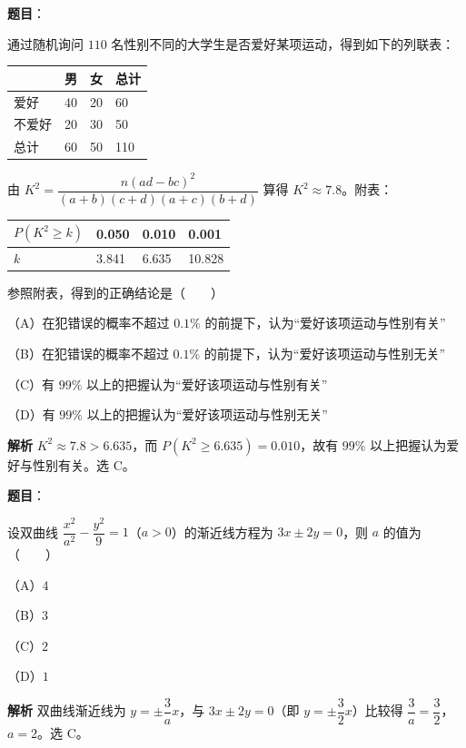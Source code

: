 \begin{answer}

\textbf{题目}：

通过随机询问 $110$ 名性别不同的大学生是否爱好某项运动，得到如下的列联表：

\begin{center}
\begin{tabular}{llll}
\toprule
 & 男 & 女 & 总计 \\
\midrule
爱好 & 40 & 20 & 60 \\
不爱好 & 20 & 30 & 50 \\
总计 & 60 & 50 & 110 \\
\bottomrule
\end{tabular}
\end{center}

由 $K^2=\dfrac{n(ad-bc)^2}{(a+b)(c+d)(a+c)(b+d)}$ 算得 $K^2\approx7.8$。附表：

\begin{center}
\begin{tabular}{llll}
\toprule
$P(K^2\geqslant k)$ & 0.050 & 0.010 & 0.001 \\
\midrule
$k$ & 3.841 & 6.635 & 10.828 \\
\bottomrule
\end{tabular}
\end{center}

参照附表，得到的正确结论是\mbox{（　　）}

（A）在犯错误的概率不超过 $0.1\%$ 的前提下，认为“爱好该项运动与性别有关”

（B）在犯错误的概率不超过 $0.1\%$ 的前提下，认为“爱好该项运动与性别无关”

（C）有 $99\%$ 以上的把握认为“爱好该项运动与性别有关”

（D）有 $99\%$ 以上的把握认为“爱好该项运动与性别无关”

\textbf{解析}
$K^2\approx7.8>6.635$，而 $P(K^2\geqslant6.635)=0.010$，故有 $99\%$ 以上把握认为爱好与性别有关。选 C。


\end{answer}
\begin{answer}

\textbf{题目}：

设双曲线 $\dfrac{x^2}{a^2}-\dfrac{y^2}9=1$（$a>0$）的渐近线方程为 $3x\pm2y=0$，则 $a$ 的值为\mbox{（　　）}

（A）$4$

（B）$3$

（C）$2$

（D）$1$

\textbf{解析}
双曲线渐近线为 $y=\pm\dfrac3a x$，与 $3x\pm2y=0$（即 $y=\pm\dfrac32x$）比较得 $\dfrac3a=\dfrac32$，$a=2$。选 C。


\end{answer}
